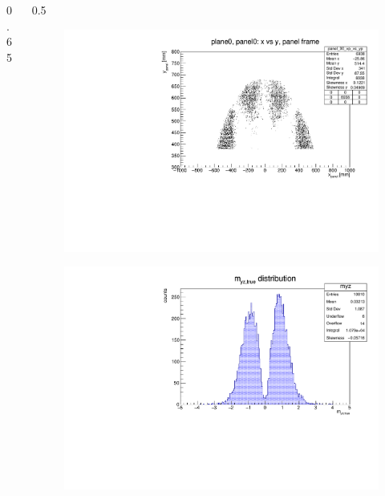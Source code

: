 \documentclass{beamer}
\begin{document}
\begin{frame}
\begin{columns}
\begin{column}{0.65\framewidth}
\begin{itemize}
\end{itemize}
\end{column}
\begin{column}{0.5\framewidth}
\vspace{-2mm}
      \begin{figure}[!h]
      \centering
\includegraphics[width=1.\columnwidth]{figures/pdf/xp_vs_yp_panel0.pdf}
     \label{fig:normalhits}
\end{figure}
\vspace{-5mm}
         \begin{figure}[!h]
      \centering
      \includegraphics[width=1.\columnwidth]{figures/pdf/myz.pdf}
     \label{fig:normalhits}
\end{figure}
\end{column}
\end{columns}
\end{frame}
\end{document}
